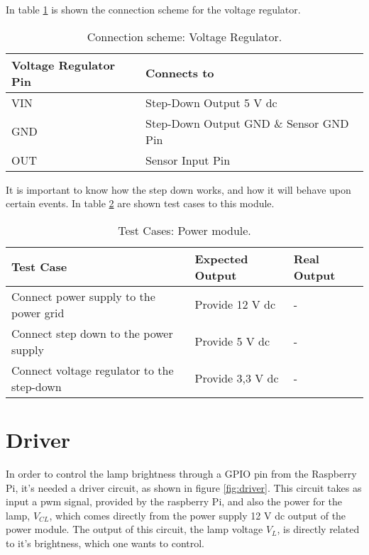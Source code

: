 
In table \ref{table:volReg_connect} is shown the connection scheme for the voltage regulator.

\begin{table}[H]
	\centering
	\begin{tabular}{|m{5cm}|m{6cm}|}
		\hline
		\textbf{Voltage Regulator Pin} & \textbf{Connects to}
		\\\hline\hline
		
		VIN & Step-Down Output 5 V \ac{dc}
		\\\hline
		GND & Step-Down Output GND \& Sensor GND Pin
		\\\hline
		OUT & Sensor Input Pin
		\\\hline
	\end{tabular}
	
	\caption{Connection scheme: Voltage Regulator.}
	\label{table:volReg_connect}
\end{table}


It is important to know how the step down works, and how it will behave upon certain events. In table \ref{table:test_step_down} are shown test cases to this module.

\begin{table}[H]
	\centering
	\resizebox{\columnwidth}{!}
	{
		\begin{tabular}{|m{5cm}|m{4cm}||m{4cm}|}
			\hline
			\textbf{Test Case} & \textbf{Expected Output} & \textbf{Real Output}
			\\\hline\hline
			Connect power supply to the power grid & Provide 12 V \ac{dc} & -
			\\\hline
			Connect step down to the power supply & Provide 5 V \ac{dc} & -
			\\\hline
			Connect voltage regulator to the step-down & Provide 3,3 V \ac{dc} & -
			\\\hline
		\end{tabular}
	}
	\caption{Test Cases: Power module.}
	\label{table:test_step_down}
\end{table}

\section{Driver}
\label{subsection:driver}
In order to control the lamp brightness through a GPIO pin from the Raspberry Pi, it's needed a driver circuit, as shown in figure \ref{fig:driver}. This circuit takes as input a \ac{pwm} signal, provided by the raspberry Pi, and also the power for the lamp, \(V_{CL}\), which comes directly from the power supply 12 V \ac{dc} output of the power module. The output of this circuit, the lamp voltage \(V_{L}\), is directly related to it's brightness, which one wants to control.

